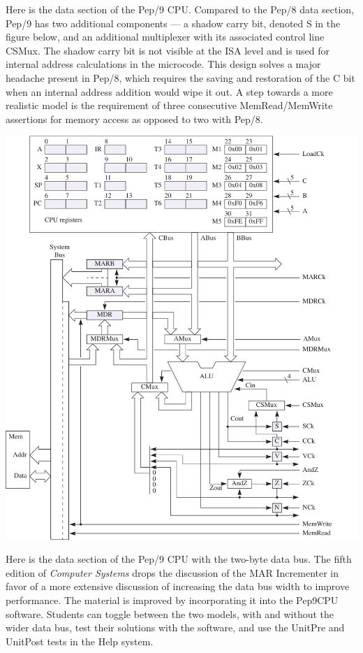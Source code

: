 \documentclass[10pt,fleqn]{book}
\begin{document}
\newpage

\noindent Here is the data section of the Pep/9 CPU.
Compared to the Pep/8 data section, Pep/9 has two additional components --- a shadow carry bit, denoted S in the figure below, and an additional multiplexer with its associated control line CSMux.
The shadow carry bit is not visible at the ISA level and is used for internal address calculations in the microcode.
This design solves a major headache present in Pep/8, which requires the saving and restoration of the C bit when an internal address addition would wipe it out.
A step towards a more realistic model is the requirement of three consecutive MemRead/MemWrite assertions for memory access as opposed to two with Pep/8.\\
\begin{center}
\includegraphics{pep9cpu.pdf}
\end{center}

\newpage

\noindent Here is the data section of the Pep/9 CPU with the two-byte data bus.
The fifth edition of \textit{Computer Systems} drops the discussion of the MAR Incrementer in favor of a more extensive discussion of increasing the data bus width to improve performance.
The material is improved by incorporating it into the Pep9CPU software.
Students can toggle between the two models, with and without the wider data bus, test their solutions with the software, and use the UnitPre and UnitPost tests in the Help system.
\end{document}
